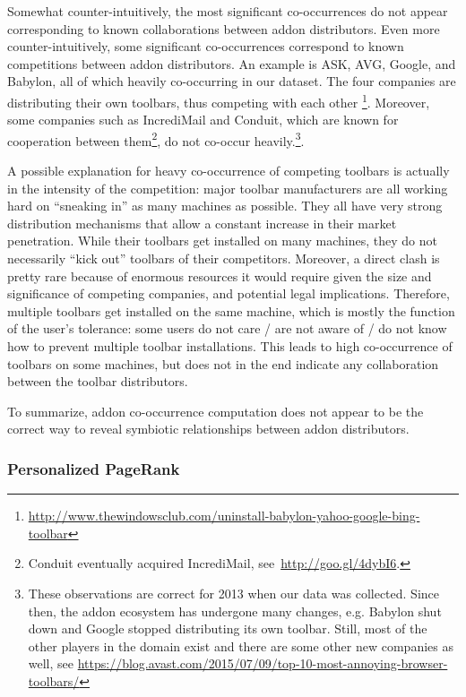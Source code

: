 \documentclass[11pt,oneside]{book}
\let\Oldsubsubsection\subsubsection
\renewcommand{\subsubsection}{\FloatBarrier\Oldsubsubsection}
\begin{document}
Somewhat counter-intuitively, the most significant co-occurrences do not appear corresponding to known collaborations between addon distributors. Even more counter-intuitively, some significant co-occurrences correspond to known competitions between addon distributors. An example is ASK, AVG, Google, and Babylon, all of which heavily co-occurring in our dataset. The four companies are distributing their own toolbars, thus competing with each other \footnote{\url{http://www.thewindowsclub.com/uninstall-babylon-yahoo-google-bing-toolbar}}. Moreover, some companies such as IncrediMail and Conduit, which are known for cooperation between them\footnote{Conduit eventually acquired IncrediMail, see~\url{http://goo.gl/4dybI6}.}, do not co-occur heavily.\footnote{These observations are correct for 2013 when our data was collected. Since then, the addon ecosystem has undergone many changes, e.g. Babylon shut down and Google stopped distributing its own toolbar. Still, most of the other players in the domain exist and there are some other new companies as well, see \url{https://blog.avast.com/2015/07/09/top-10-most-annoying-browser-toolbars/}}.

A possible explanation for heavy co-occurrence of competing toolbars is actually in the intensity of the competition: major toolbar manufacturers are all working hard on ``sneaking in'' as many machines as possible. They all have very strong distribution mechanisms that allow a constant increase in their market penetration. While their toolbars get installed on many machines, they do not necessarily ``kick out'' toolbars of their competitors. Moreover, a direct clash is pretty rare because of enormous resources it would require given the size and significance of competing companies, and potential legal implications. Therefore, multiple toolbars get installed on the same machine, which is mostly the function of the user's tolerance: some users do not care / are not aware of / do not know how to prevent multiple toolbar installations. This leads to high co-occurrence of toolbars on some machines, but does not in the end indicate any collaboration between the toolbar distributors.

To summarize, addon co-occurrence computation does not appear to be the correct way to reveal symbiotic relationships between addon distributors.

\subsubsection{Personalized PageRank}
\end{document}
